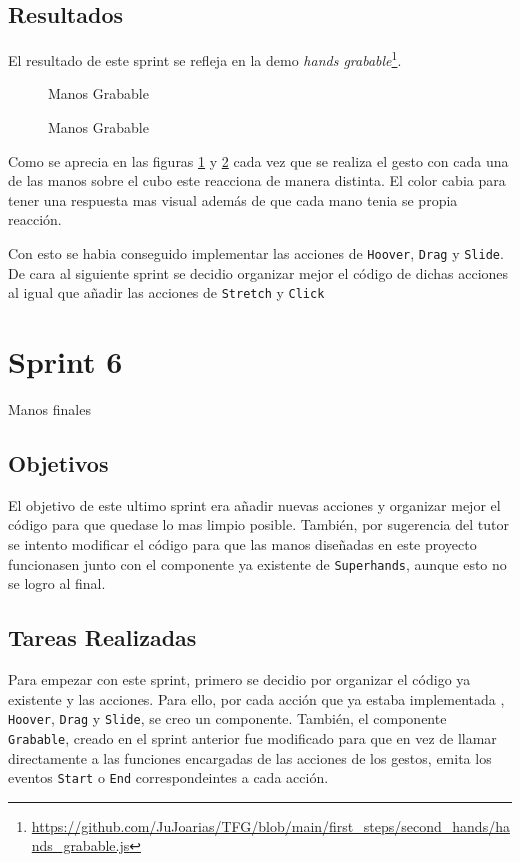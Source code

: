 \documentclass[a4paper, 12pt]{book}
\begin{document}
\subsection{Resultados}
\label{subsec:resultados5}
El resultado de este sprint se refleja en la demo \textit{hands grabable}\footnote{\url{https://github.com/JuJoarias/TFG/blob/main/first_steps/second_hands/hands_grabable.js}}. 

\begin{figure}[H] 
  \centering
  \fbox{\rule{0pt}{150pt} \rule{0.7\textwidth}{0pt}} 
  \caption{Manos Grabable}
  \label{fig:sprint5-1}
\end{figure}

\begin{figure}[H] 
  \centering
  \fbox{\rule{0pt}{150pt} \rule{0.7\textwidth}{0pt}} 
  \caption{Manos Grabable}
  \label{fig:sprint5-2}
\end{figure}

Como se aprecia en las figuras \ref{fig:sprint5-1} y \ref{fig:sprint5-2} cada vez que se realiza el gesto con cada una de las manos sobre el cubo este reacciona de manera distinta. 
El color cabia para tener una respuesta mas visual además de que cada mano tenia se propia reacción. 

Con esto se habia conseguido implementar las acciones de \texttt{Hoover}, \texttt{Drag} y \texttt{Slide}. De cara al siguiente sprint se decidio organizar mejor el código de dichas acciones al igual que añadir las acciones de \texttt{Stretch} y \texttt{Click}

\section{Sprint 6}
\label{sec:sprint6}
Manos finales

\subsection{Objetivos}
\label{subsec:objetivo-principal6}
El objetivo de este ultimo sprint era añadir nuevas acciones y organizar mejor el código para que quedase lo mas limpio posible. 
También, por sugerencia del tutor se intento modificar el código para que las manos diseñadas en este proyecto funcionasen junto con el componente ya existente de \texttt{Superhands}, aunque esto no se logro al final. 

\subsection{Tareas Realizadas}
\label{subsec:implementacion6}
Para empezar con este sprint, primero se decidio por organizar el código ya existente y las acciones. Para ello, por cada acción que ya estaba implementada , \texttt{Hoover}, \texttt{Drag} y \texttt{Slide}, se creo un componente. También, el componente \texttt{Grabable}, creado en el sprint anterior fue modificado para que en vez de llamar directamente a las funciones encargadas de las acciones de los gestos, emita los eventos \texttt{Start} o \texttt{End} correspondeintes a cada acción. 
\end{document}
